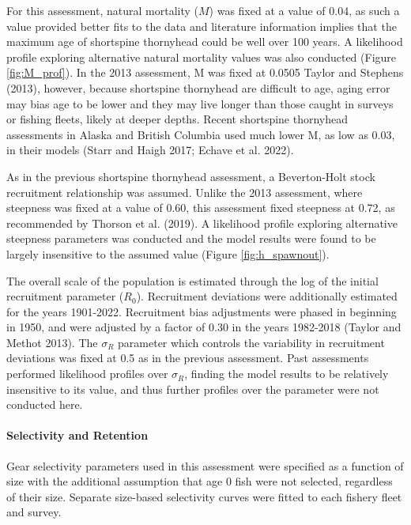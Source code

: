 \documentclass[11pt,
  letterpaper,
]{article}
\begin{document}
For this assessment, natural mortality (\(M\)) was fixed at a value of 0.04, as such a value provided better fits to the data and literature information implies that the maximum age of shortspine thornyhead could be well over 100 years. A likelihood profile exploring alternative natural mortality values was also conducted (Figure \ref{fig:M_prof}). In the 2013 assessment, M was fixed at 0.0505 Taylor and Stephens (2013), however, because shortspine thornyhead are difficult to age, aging error may bias age to be lower and they may live longer than those caught in surveys or fishing fleets, likely at deeper depths. Recent shortspine thornyhead assessments in Alaska and British Columbia used much lower M, as low as 0.03, in their models (Starr and Haigh 2017; Echave et al. 2022).

As in the previous shortspine thornyhead assessment, a Beverton-Holt stock recruitment relationship was assumed. Unlike the 2013 assessment, where steepness was fixed at a value of 0.60, this assessment fixed steepness at 0.72, as recommended by Thorson et al. (2019). A likelihood profile exploring alternative steepness parameters was conducted and the model results were found to be largely insensitive to the assumed value (Figure \ref{fig:h_spawnout}).

The overall scale of the population is estimated through the log of the initial recruitment parameter (\(R_0\)). Recruitment deviations were additionally estimated for the years 1901-2022. Recruitment bias adjustments were phased in beginning in 1950, and were adjusted by a factor of 0.30 in the years 1982-2018 (Taylor and Methot 2013). The \(\sigma_R\) parameter which controls the variability in recruitment deviations was fixed at 0.5 as in the previous assessment. Past assessments performed likelihood profiles over \(\sigma_R\), finding the model results to be relatively insensitive to its value, and thus further profiles over the parameter were not conducted here.

\hypertarget{selectivity-and-retention}{%
\paragraph{Selectivity and Retention}\label{selectivity-and-retention}}

Gear selectivity parameters used in this assessment were specified as a function of size with the additional assumption that age 0 fish were not selected, regardless of their size. Separate size-based selectivity curves were fitted to each fishery fleet and survey.
\end{document}
